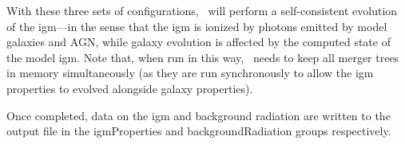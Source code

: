 With these three sets of configurations, \glc\ will perform a self-consistent evolution of the \gls{igm}---in the sense that the \gls{igm} is ionized by photons emitted by model galaxies and AGN, while galaxy evolution is affected by the computed state of the model \gls{igm}. Note that, when run in this way, \glc\ needs to keep all merger trees in memory simultaneously (as they are run synchronously to allow the \gls{igm} properties to evolved alongside galaxy properties).

Once completed, data on the \gls{igm} and background radiation are written to the output file in the {\normalfont \ttfamily igmProperties} and {\normalfont \ttfamily backgroundRadiation} groups respectively.
